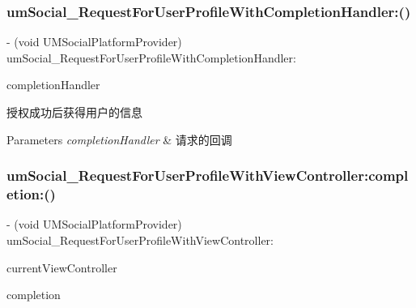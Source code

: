 \subsubsection{\texorpdfstring{um\+Social\+\_\+\+Request\+For\+User\+Profile\+With\+Completion\+Handler\+:()}{umSocial\_RequestForUserProfileWithCompletionHandler:()}\hspace{0.1cm}{\footnotesize\ttfamily [2/2]}}
{\footnotesize\ttfamily -\/ (void U\+M\+Social\+Platform\+Provider) um\+Social\+\_\+\+Request\+For\+User\+Profile\+With\+Completion\+Handler\+: \begin{DoxyParamCaption}\item[{(U\+M\+Social\+Request\+Completion\+Handler)}]{completion\+Handler }\end{DoxyParamCaption}}

授权成功后获得用户的信息


\begin{DoxyParams}{Parameters}
{\em completion\+Handler} & 请求的回调 \\
\hline
\end{DoxyParams}
\mbox{\label{protocol_u_m_social_platform_provider_01-p_a19f829db2b2d3c83f332556b3685e411}} 
\subsubsection{\texorpdfstring{um\+Social\+\_\+\+Request\+For\+User\+Profile\+With\+View\+Controller\+:completion\+:()}{umSocial\_RequestForUserProfileWithViewController:completion:()}\hspace{0.1cm}{\footnotesize\ttfamily [1/2]}}
{\footnotesize\ttfamily -\/ (void U\+M\+Social\+Platform\+Provider) um\+Social\+\_\+\+Request\+For\+User\+Profile\+With\+View\+Controller\+: \begin{DoxyParamCaption}\item[{(id)}]{current\+View\+Controller }\item[{completion:(U\+M\+Social\+Request\+Completion\+Handler)}]{completion }\end{DoxyParamCaption}}

